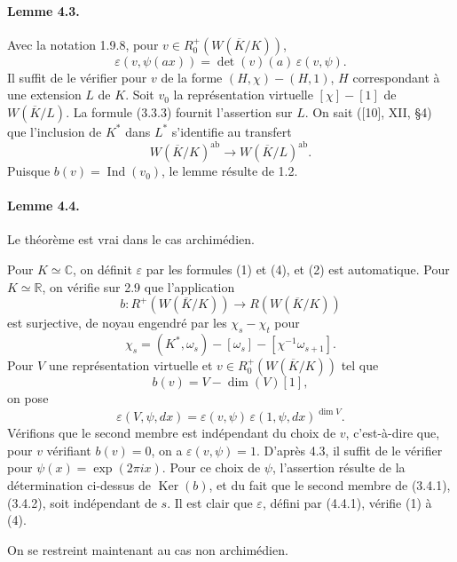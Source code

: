 \documentclass[10pt]{article}
\newcommand{\C}{\mathbb C}
\newcommand{\Ind}{\operatorname{Ind}}
\providecommand{\Ker}{\operatorname{Ker}}
\providecommand{\ab}{\mathrm{ab}}
\providecommand{\R}{\mathbb R}
\providecommand{\ab}{\mathrm{ab}}
\begin{document}
\paragraph{Lemme 4.3.} Avec la notation 1.9.8, pour \(v\in R^+_0(W(\overline K/K))\),
\[
\varepsilon(v,\psi(ax))=\det(v)(a)\,\varepsilon(v,\psi).
\]
Il suffit de le vérifier pour \(v\) de la forme \((H,\chi)-(H,1)\), \(H\) correspondant à une extension \(L\) de \(K\). Soit \(v_0\) la représentation virtuelle \([\chi]-[1]\) de \(W(\overline K/L)\). La formule (3.3.3) fournit l'assertion sur \(L\). On sait ([10], XII, §4) que l'inclusion de \(K^*\) dans \(L^*\) s'identifie au transfert
\[
W(\overline K/K)^{\ab}\longrightarrow W(\overline K/L)^{\ab}.
\]
Puisque \(b(v)=\Ind(v_0)\), le lemme résulte de 1.2.

\paragraph{Lemme 4.4.} Le théorème est vrai dans le cas archimédien.

Pour \(K\simeq\C\), on définit \(\varepsilon\) par les formules (1) et (4), et (2) est automatique. Pour \(K\simeq\R\), on vérifie sur 2.9 que l'application
\[
b:R^+(W(\overline K/K))\longrightarrow R(W(\overline K/K))
\]
est surjective, de noyau engendré par les \(\chi_s-\chi_t\) pour
\[
\chi_s=(K^*,\omega_s)-[\omega_s]-[\chi^{-1}\omega_{s+1}].
\]
Pour \(V\) une représentation virtuelle et \(v\in R^+_0(W(\overline K/K))\) tel que
\[
b(v)=V-\dim(V)[1],
\]
on pose
\[
\tag{4.4.1}
\varepsilon(V,\psi,dx)=\varepsilon(v,\psi)\,\varepsilon(1,\psi,dx)^{\dim V}.
\]
Vérifions que le second membre est indépendant du choix de \(v\), c'est-à-dire que, pour \(v\) vérifiant \(b(v)=0\), on a \(\varepsilon(v,\psi)=1\). D'après 4.3, il suffit de le vérifier pour \(\psi(x)=\exp(2\pi ix)\). Pour ce choix de \(\psi\), l'assertion résulte de la détermination ci-dessus de \(\Ker(b)\), et du fait que le second membre de (3.4.1), (3.4.2), soit indépendant de \(s\). Il est clair que \(\varepsilon\), défini par (4.4.1), vérifie (1) à (4).

On se restreint maintenant au cas non archimédien.
\end{document}
